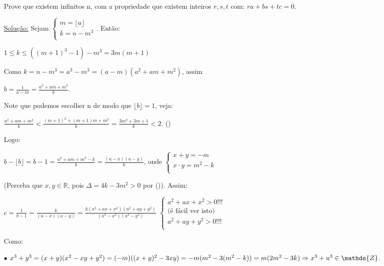 \documentclass[a4paper,12pt]{article}
\renewcommand{\leq}{\ensuremath{\leqslant}}
\newcommand*{\hm}[1]{#1\nobreak\discretionary{}
	{\hbox{$\mathsurround=0pt #1$}}{}}
\theoremstyle{plain} %
\theoremstyle{definition} %
\theoremstyle{remark} %
\begin{document}
	Prove que existem infinitos n, com a propriedade que existem inteiros $r, s, t$ com: $ra+bs+tc=0$.
	
	\begin{framed}
		\underline{Solu\c{c}\~ao:} Sejam $\left\{
		\begin{array}{lc}
			m=\lfloor a\rfloor \\
			k=n-m^3\\
		\end{array}
		\right.$. Ent\~ao:
		
		\begin{center}
			$1\leq k\leq ((m+1)^3-1)-m^3=3m(m+1)$
		\end{center}
		
		Como $k=n-m^3=a^3-m^3=(a-m)(a^2+am+m^2)$, assim
		
		\begin{center}
			$b=\displaystyle\frac{1}{a-m}=\frac{a^2+am+m^2}{k}$.
		\end{center}
		
		Note que podemos escolher n de modo que $\lfloor b\rfloor=1$, veja:
		
		$\displaystyle\frac{a^2+am+m^2}{k}<\frac{(m+1)^2+(m+1)m+m^2}{k}=\frac{3m^2+3m+1}{k}<2$. (\textasteriskcentered)
		
		Logo:
		
		$\displaystyle b-\lfloor b\rfloor=b-1=\frac{a^2+am+m^2-k}{k}=\frac{(a-x)(a-y)}{k}$, onde $\left\{
		\begin{array}{lc}
			x+y=-m \\
			x\cdot y=m^2-k\\
		\end{array}
		\right.$
		
		(Perceba que $x, y\in \mathds{R}$, pois $\Delta=4k-3m^2>0$ por (\textasteriskcentered)). Assim:
		
		\begin{center}
			$\displaystyle c=\frac{1}{b-1}=\frac{k}{(a-x)(a-y)}=\frac{k(a^2+ax+x^2)(a^2+ay+y^2)}{(a^3-x^3)(a^3-y^3)}$ $\left\{\begin{array}{lc}
				a^2+ax+x^2>0 !!!\\
				\text{(\'e f\'acil ver isto)}\\
				a^2+ay+y^2>0 !!!\\
			\end{array}
			\right.$
		\end{center}
		
		Como:
		
		$\bullet$ \hspace{1em} $x^3+y^3=(x+y)(x^2-xy+y^2)=(-m)((x+y)^2-3xy)=-m(m^2-3(m^2-k))                       \hm{=}m(2m^2-3k)\Rightarrow x^3+u^3\in \mathds{Z}$.
		

\end{framed}
\end{document}
